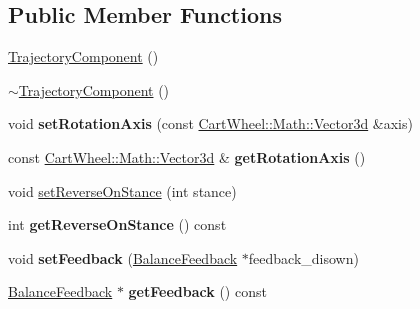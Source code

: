 \subsection*{Public Member Functions}
\begin{DoxyCompactItemize}
\item 
\hyperlink{classCartWheel_1_1Core_1_1TrajectoryComponent_a3ce585a4c61f32e6293ab6d200ce1ed3}{TrajectoryComponent} ()
\item 
\hyperlink{classCartWheel_1_1Core_1_1TrajectoryComponent_a6d6f6955cd8b3812c19c245a710a3eea}{$\sim$TrajectoryComponent} ()
\item 
\hypertarget{classCartWheel_1_1Core_1_1TrajectoryComponent_ae550db68b78cfdb742621268db344631}{
void {\bfseries setRotationAxis} (const \hyperlink{classCartWheel_1_1Math_1_1Vector3d}{CartWheel::Math::Vector3d} \&axis)}
\label{classCartWheel_1_1Core_1_1TrajectoryComponent_ae550db68b78cfdb742621268db344631}

\item 
\hypertarget{classCartWheel_1_1Core_1_1TrajectoryComponent_aa78f83afa8188f33aa7fba3754b999dc}{
const \hyperlink{classCartWheel_1_1Math_1_1Vector3d}{CartWheel::Math::Vector3d} \& {\bfseries getRotationAxis} ()}
\label{classCartWheel_1_1Core_1_1TrajectoryComponent_aa78f83afa8188f33aa7fba3754b999dc}

\item 
void \hyperlink{classCartWheel_1_1Core_1_1TrajectoryComponent_a18c1726753bacdef000f0e6e7c181f0a}{setReverseOnStance} (int stance)
\item 
\hypertarget{classCartWheel_1_1Core_1_1TrajectoryComponent_aaffdb60065bd9c5cb6103be1fab84937}{
int {\bfseries getReverseOnStance} () const }
\label{classCartWheel_1_1Core_1_1TrajectoryComponent_aaffdb60065bd9c5cb6103be1fab84937}

\item 
\hypertarget{classCartWheel_1_1Core_1_1TrajectoryComponent_a0c0d5d618a600e12436ce5141ec9eeeb}{
void {\bfseries setFeedback} (\hyperlink{classCartWheel_1_1Core_1_1BalanceFeedback}{BalanceFeedback} $\ast$feedback\_\-disown)}
\label{classCartWheel_1_1Core_1_1TrajectoryComponent_a0c0d5d618a600e12436ce5141ec9eeeb}

\item 
\hypertarget{classCartWheel_1_1Core_1_1TrajectoryComponent_a77fcb6ea3c43e2394143a6fdc64b2e80}{
\hyperlink{classCartWheel_1_1Core_1_1BalanceFeedback}{BalanceFeedback} $\ast$ {\bfseries getFeedback} () const }
\label{classCartWheel_1_1Core_1_1TrajectoryComponent_a77fcb6ea3c43e2394143a6fdc64b2e80}


\end{DoxyCompactItemize}
